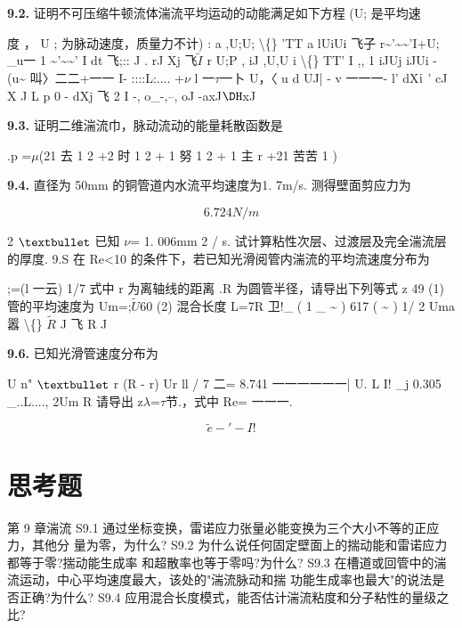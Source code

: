 \noindent\textbf{9.2.} 证明不可压缩牛顿流体湍流平均运动的动能满足如下方程 (U; 是平均速

度 ， U ; 为脉动速度，质量力不计) : a ,U;U; \textbackslash\{\} 'TT a lUiUi 飞子 r\textasciitilde{}'\textasciitilde{}\textasciitilde{}'I+U; \_u一 1 \textasciitilde{}'\textasciitilde{}\textasciitilde{}' I dt 飞;:: J . rJ Xj 飞$\tilde{I}$ r U;P , iJ ,U,U i \textbackslash\{\} TT' I ,, 1 iJUj iJUi - (u\textasciitilde{} 叫〉二二+一一 I- ::::L:.... +$\nu$ l 一$\tau$一卜 U，〈 u d UJ| - v 一一一- l' dX${\rm i}$ ' cJ X J L p 0 - dXj 飞 2 I -, o\_-,--, oJ -axJ${\rm Ð}$xJ

\noindent\textbf{9.3.} 证明二维湍流巾，脉动流动的能量耗散函数是

.p =$\mu$(21 去 1 2 +2 时 1 2 + 1 努 1 2 + 1 主 r +21 苦苦 1 )

\noindent\textbf{9.4.} 直径为 50mm 的铜管道内水流平均速度为1. 7m/s. 测得壁面剪应力为

\[6. 724N/m\]

2 ${\rm •}$ 已知 $\nu$= 1. 006mm 2 / s. 试计算粘性次层、过渡层及完全湍流层的厚度. 9.S 在 Re<10 的条件下，若已知光滑阅管内湍流的平均流速度分布为

;=(l 一云) 1/7 式中 r 为离轴线的距离 .R 为圆管半径，请导出下列等式 z 49 (1)管的平均速度为 Um=;$\tilde{U}$60 (2) 混合长度 L=7R 卫!\_ ( 1 \_ \textasciitilde{} ) 617 ( \textasciitilde{} ) 1/ 2 Uma 嚣 \textbackslash\{\} $\tilde{R}$ J 飞 R J

\noindent\textbf{9.6.} 已知光滑管速度分布为

U n" ${\rm •}$ r (R - r) Ur ll / 7 二= 8.741 一一一一一一| U. L I! \_j 0.305 \_..L...., 2Um R 请导出 z$\lambda$=$\tau$节.，式中 Re= 一一一.

\[\tilde{e} -' - I!\]

\section*{思考题}

第 9 章湍流 S9.1 通过坐标变换，雷诺应力张量必能变换为三个大小不等的正应力，其他分 量为零，为什么? S9.2 为什么说任何固定壁面上的揣动能和雷诺应力都等于零?揣动能生成率 和超散率也等于零吗?为什么? S9.3 在槽道或回管中的湍流运动，中心平均速度最大，该处的"湍流脉动和揣 功能生成率也最大"的说法是否正确?为什么? S9.4 应用混合长度模式，能否估计湍流粘度和分子粘性的量级之比?
